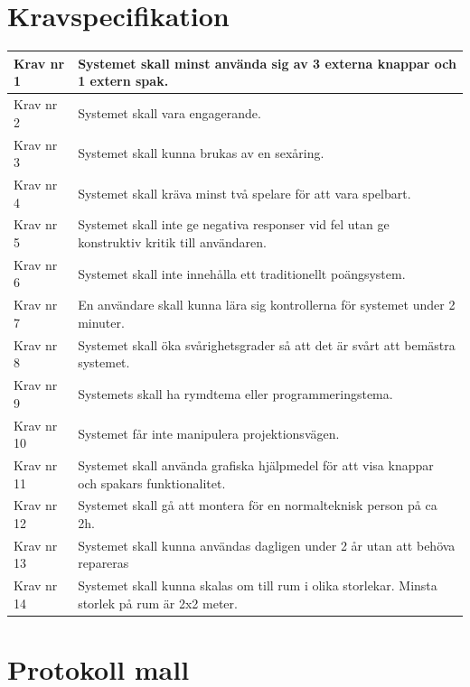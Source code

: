 \documentclass[a4paper,12pt,oneside,final]{extbook}
\begin{document}




\pagestyle{empty}

\appendix

\chapter{Kravspecifikation}\label{Kravspecifikation}
\begin{center}
	\begin{tabular}{ | m{5em} | m{30em}| } 
		\hline
		Krav nr 1& Systemet skall minst använda sig av 3 externa knappar och 1 extern spak.   \\ 
		\hline
		Krav nr 2 & Systemet skall vara engagerande.  \\ 
		\hline
		Krav nr 3 & Systemet skall kunna brukas av en sexåring. \\ 
		\hline
		Krav nr 4& Systemet skall kräva minst två spelare för att vara spelbart. \\ 
		\hline
		Krav nr 5 & Systemet skall inte ge negativa responser vid fel utan ge konstruktiv kritik till användaren. \\ 
		\hline
		Krav nr 6 & Systemet skall inte innehålla ett traditionellt poängsystem. \\ 
		\hline
		Krav nr 7& En användare skall kunna lära sig kontrollerna för systemet under 2 minuter. \\ 
		\hline
		Krav nr 8 & Systemet skall öka svårighetsgrader så att det är svårt att bemästra systemet. \\ 
		\hline
		Krav nr 9 & Systemets skall ha rymdtema eller programmeringstema. \\ 
		\hline
		Krav nr 10& Systemet får inte manipulera projektionsvägen. \\ 
		\hline
		Krav nr 11& Systemet skall använda grafiska hjälpmedel för att visa knappar och spakars funktionalitet.  \\ 
		\hline
		Krav nr 12& Systemet skall gå att montera för en normalteknisk person på ca 2h. \\ 
		\hline
		Krav nr 13& Systemet skall kunna användas dagligen under 2 år utan att behöva repareras \\ 
		\hline
		Krav nr 14 & Systemet skall kunna skalas om till rum i olika storlekar. Minsta storlek på rum är 2x2 meter. \\ 
		\hline
	\end{tabular}
\end{center}


\chapter{Protokoll mall}\label{protokoll}
\end{document}
